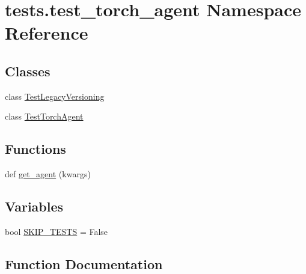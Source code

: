 \hypertarget{namespacetests_1_1test__torch__agent}{}\section{tests.\+test\+\_\+torch\+\_\+agent Namespace Reference}
\label{namespacetests_1_1test__torch__agent}
\subsection*{Classes}
\begin{DoxyCompactItemize}
\item 
class \hyperlink{classtests_1_1test__torch__agent_1_1TestLegacyVersioning}{Test\+Legacy\+Versioning}
\item 
class \hyperlink{classtests_1_1test__torch__agent_1_1TestTorchAgent}{Test\+Torch\+Agent}
\end{DoxyCompactItemize}
\subsection*{Functions}
\begin{DoxyCompactItemize}
\item 
def \hyperlink{namespacetests_1_1test__torch__agent_ae929d109305aaea29fbfa13ecf1f32e9}{get\+\_\+agent} (kwargs)
\end{DoxyCompactItemize}
\subsection*{Variables}
\begin{DoxyCompactItemize}
\item 
bool \hyperlink{namespacetests_1_1test__torch__agent_a158dbc1f1b2ee55f020fb0ad7a99c116}{S\+K\+I\+P\+\_\+\+T\+E\+S\+TS} = False
\end{DoxyCompactItemize}


\subsection{Function Documentation}
\mbox{\label{namespacetests_1_1test__torch__agent_ae929d109305aaea29fbfa13ecf1f32e9}} 
